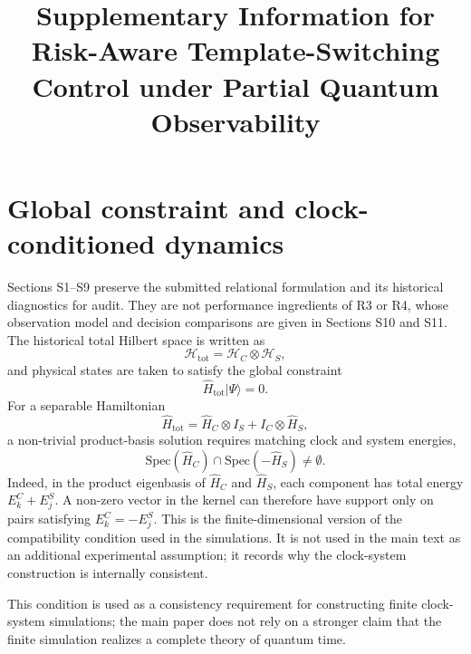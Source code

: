 \documentclass[11pt]{article}
\title{Supplementary Information for\\
Risk-Aware Template-Switching Control under Partial Quantum Observability}
\author{}
\date{}
\numberwithin{equation}{section}
\begin{document}
\maketitle
\tableofcontents

\section{Global constraint and clock-conditioned dynamics}

Sections S1--S9 preserve the submitted relational formulation and its historical
diagnostics for audit.  They are not performance ingredients of R3 or R4,
whose observation model and decision comparisons are given in Sections S10
and S11. The historical total Hilbert space is written as
\begin{equation}
\mathcal{H}_{\mathrm{tot}}
=
\mathcal{H}_C\otimes \mathcal{H}_S,
\end{equation}
and physical states are taken to satisfy the global constraint
\begin{equation}
\hat H_{\mathrm{tot}}|\Psi\rangle=0.
\end{equation}
For a separable Hamiltonian
\begin{equation}
\hat H_{\mathrm{tot}}
=
\hat H_C\otimes I_S+I_C\otimes \hat H_S,
\end{equation}
a non-trivial product-basis solution requires matching clock and system energies,
\begin{equation}
\mathrm{Spec}(\hat H_C)\cap \mathrm{Spec}(-\hat H_S)\neq \emptyset .
\end{equation}
Indeed, in the product eigenbasis of $\hat H_C$ and $\hat H_S$, each component
has total energy $E^C_k+E^S_j$. A non-zero vector in the kernel can therefore have
support only on pairs satisfying $E^C_k=-E^S_j$. This is the finite-dimensional
version of the compatibility condition used in the simulations. It is not used in
the main text as an additional experimental assumption; it records why the
clock-system construction is internally consistent.

This condition is used as a consistency requirement for constructing finite
clock-system simulations; the main paper does not rely on a stronger claim that
the finite simulation realizes a complete theory of quantum time.
\end{document}
